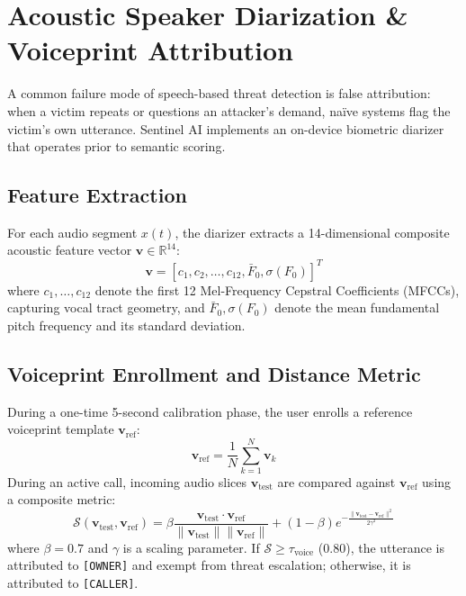 \documentclass[conference]{IEEEtran}
\begin{document}
\section{Acoustic Speaker Diarization \& Voiceprint Attribution}
A common failure mode of speech-based threat detection is false attribution: when a victim repeats or questions an attacker's demand, naïve systems flag the victim's own utterance. Sentinel AI implements an on-device biometric diarizer that operates prior to semantic scoring.

\subsection{Feature Extraction}
For each audio segment $x(t)$, the diarizer extracts a 14-dimensional composite acoustic feature vector $\mathbf{v} \in \mathbb{R}^{14}$:
\begin{equation}
\mathbf{v} = \left[ c_1, c_2, \dots, c_{12}, \bar{F}_0, \sigma(F_0) \right]^T
\end{equation}
where $c_1, \dots, c_{12}$ denote the first 12 Mel-Frequency Cepstral Coefficients (MFCCs), capturing vocal tract geometry, and $\bar{F}_0, \sigma(F_0)$ denote the mean fundamental pitch frequency and its standard deviation.

\subsection{Voiceprint Enrollment and Distance Metric}
During a one-time 5-second calibration phase, the user enrolls a reference voiceprint template $\mathbf{v}_{\text{ref}}$:
\begin{equation}
\mathbf{v}_{\text{ref}} = \frac{1}{N} \sum_{k=1}^N \mathbf{v}_k
\end{equation}
During an active call, incoming audio slices $\mathbf{v}_{\text{test}}$ are compared against $\mathbf{v}_{\text{ref}}$ using a composite metric:
\begin{equation}
\mathcal{S}(\mathbf{v}_{\text{test}}, \mathbf{v}_{\text{ref}}) = \beta \frac{\mathbf{v}_{\text{test}} \cdot \mathbf{v}_{\text{ref}}}{\|\mathbf{v}_{\text{test}}\| \|\mathbf{v}_{\text{ref}}\|} + (1 - \beta) e^{-\frac{\|\mathbf{v}_{\text{test}} - \mathbf{v}_{\text{ref}}\|^2}{2\gamma^2}}
\end{equation}
where $\beta = 0.7$ and $\gamma$ is a scaling parameter. If $\mathcal{S} \ge \tau_{\text{voice}}$ ($0.80$), the utterance is attributed to \texttt{[OWNER]} and exempt from threat escalation; otherwise, it is attributed to \texttt{[CALLER]}.
\end{document}
